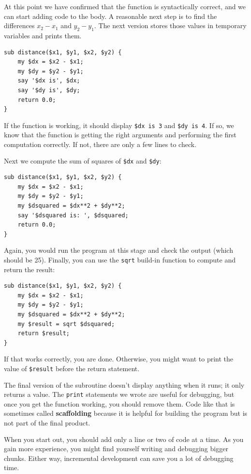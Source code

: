 At this point we have confirmed that the function is syntactically
correct, and we can start adding code to the body.
A reasonable next step is to find the differences
$x_2 - x_1$ and $y_2 - y_1$.  The next version stores those values in
temporary variables and prints them.

\begin{verbatim}
sub distance($x1, $y1, $x2, $y2) {
    my $dx = $x2 - $x1;
    my $dy = $y2 - $y1;
    say '$dx is', $dx;
    say '$dy is', $dy;
    return 0.0;
}
\end{verbatim}
%
If the function is working, it should display \verb"$dx is 3" and 
\verb"$dy is 4".  If so, we know that the function is getting the right
arguments and performing the first computation correctly.  If not,
there are only a few lines to check.

Next we compute the sum of squares of {\tt \$dx} and {\tt \$dy}:

\begin{verbatim}
sub distance($x1, $y1, $x2, $y2) {
    my $dx = $x2 - $x1;
    my $dy = $y2 - $y1;
    my $dsquared = $dx**2 + $dy**2;
    say '$dsquared is: ', $dsquared;
    return 0.0;
}
\end{verbatim}
%
Again, you would run the program at this stage and check the output
(which should be 25).
Finally, you can use the {\tt sqrt} build-in function to compute 
and return the result:

\begin{verbatim}
sub distance($x1, $y1, $x2, $y2) {
    my $dx = $x2 - $x1;
    my $dy = $y2 - $y1;
    my $dsquared = $dx**2 + $dy**2;
    my $result = sqrt $dsquared;
    return $result;
}
\end{verbatim}
%
If that works correctly, you are done.  Otherwise, you might
want to print the value of {\tt \$result} before the return
statement.

The final version of the subroutine doesn't display anything when it
runs; it only returns a value.  The {\tt print} statements we wrote
are useful for debugging, but once you get the function working, you
should remove them.  Code like that is sometimes called 
{\bf scaffolding} because it is helpful for building the program 
but is not part of the final product.

When you start out, you should add only a line or two of code at a
time.  As you gain more experience, you might find yourself writing
and debugging bigger chunks.  Either way, incremental development
can save you a lot of debugging time.

